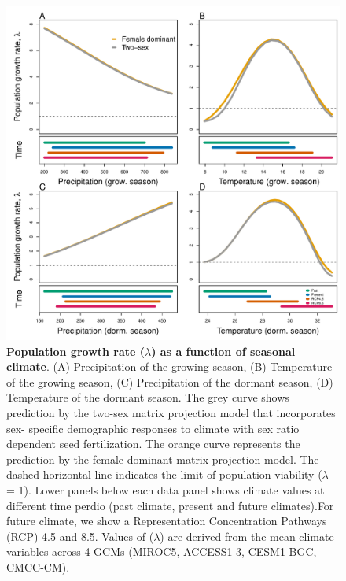 \documentclass[12pt]{article}\usepackage[]{graphicx}\usepackage[dvipsnames]{xcolor}
\begin{document}
\begin{figure}[H]
  \begin{center}
    \includegraphics[width=0.85\linewidth]{Figures/lambda_past_present_future.pdf}
  \caption{\textbf{Population growth rate ($\lambda$) as a function of seasonal climate}.
(A) Precipitation of the growing season, (B) Temperature of the growing season, (C) Precipitation of the dormant season, (D) Temperature of the dormant season.
The grey curve shows prediction by the two-sex matrix projection model that incorporates sex- specific demographic responses to climate with sex ratio dependent seed fertilization.
The orange curve represents the prediction by the female dominant matrix projection model.
The dashed horizontal line indicates the limit of population viability ($\lambda$ = 1).
Lower panels below each data panel shows climate values at different time perdio (past climate, present and future climates).For future climate, we show a Representation Concentration Pathways (RCP) 4.5 and 8.5. Values of ($\lambda$) are derived from the mean climate variables across 4 GCMs (MIROC5, ACCESS1-3, CESM1-BGC, CMCC-CM).}
  \label{fig:lambda}
  \end{center}
\end{figure}
\end{document}
